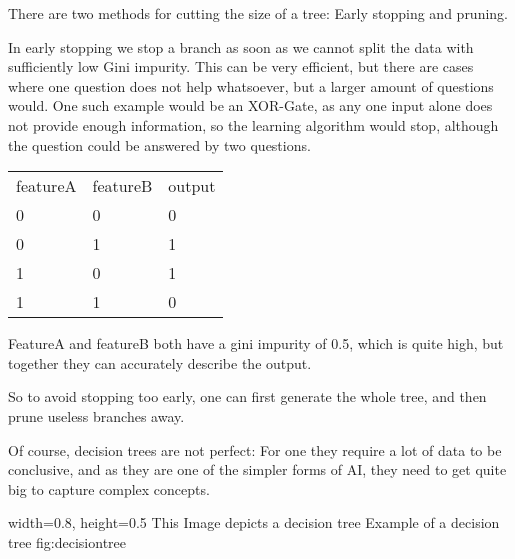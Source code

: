 There are two methods for cutting the size of a tree: Early stopping and pruning. 

In early stopping we stop a branch as soon as we cannot split the data with sufficiently low Gini impurity. This can be very efficient, but there are cases where one question does not help whatsoever, but a larger amount of questions would. One such example would be an XOR-Gate, as any one input alone does not provide enough information, so the learning algorithm would stop, although the question could be answered by two questions.

\begin{tabular}{p{} p{} p{}}
    featureA & featureB & output\\
    0 & 0 & 0 \\
    0 & 1 & 1 \\
    1 & 0 & 1 \\
    1 & 1 & 0 \\
\end{tabular}

FeatureA and featureB both have a gini impurity of 0.5, which is quite high, but together they can accurately describe the output.

So to avoid stopping too early, one can first generate the whole tree, and then prune useless branches away.

Of course, decision trees are not perfect: For one they require a lot of data to be conclusive, and as they are one of the simpler forms of AI, they need to get quite big to capture complex concepts.



    {width=0.8\textwidth, height=0.5\textheight} %
    {This Image depicts a decision tree}   %
    {Example of a decision tree}   %
    {fig:decisiontree}    %

 